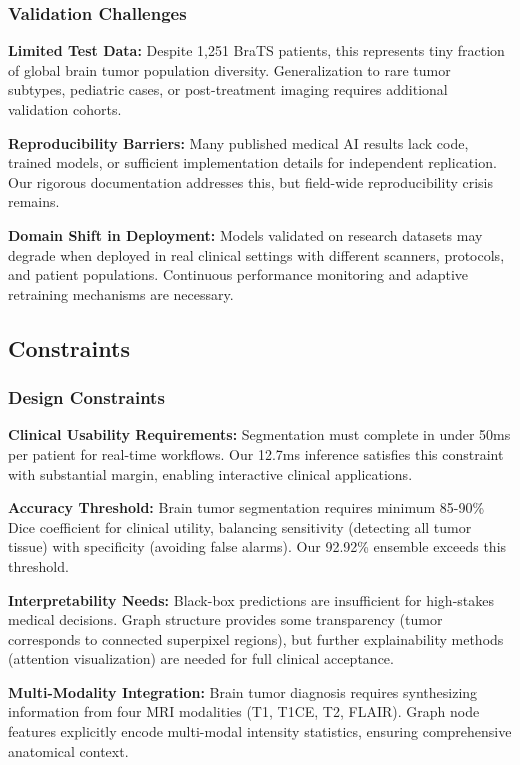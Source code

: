 \subsubsection{Validation Challenges}

\textbf{Limited Test Data:} Despite 1,251 BraTS patients, this represents tiny fraction of global brain tumor population diversity. Generalization to rare tumor subtypes, pediatric cases, or post-treatment imaging requires additional validation cohorts.

\textbf{Reproducibility Barriers:} Many published medical AI results lack code, trained models, or sufficient implementation details for independent replication. Our rigorous documentation addresses this, but field-wide reproducibility crisis remains.

\textbf{Domain Shift in Deployment:} Models validated on research datasets may degrade when deployed in real clinical settings with different scanners, protocols, and patient populations. Continuous performance monitoring and adaptive retraining mechanisms are necessary.


\subsection{Constraints}

\subsubsection{Design Constraints}

\textbf{Clinical Usability Requirements:} Segmentation must complete in under 50ms per patient for real-time workflows. Our 12.7ms inference satisfies this constraint with substantial margin, enabling interactive clinical applications.

\textbf{Accuracy Threshold:} Brain tumor segmentation requires minimum 85-90\% Dice coefficient for clinical utility, balancing sensitivity (detecting all tumor tissue) with specificity (avoiding false alarms). Our 92.92\% ensemble exceeds this threshold.

\textbf{Interpretability Needs:} Black-box predictions are insufficient for high-stakes medical decisions. Graph structure provides some transparency (tumor corresponds to connected superpixel regions), but further explainability methods (attention visualization) are needed for full clinical acceptance.

\textbf{Multi-Modality Integration:} Brain tumor diagnosis requires synthesizing information from four MRI modalities (T1, T1CE, T2, FLAIR). Graph node features explicitly encode multi-modal intensity statistics, ensuring comprehensive anatomical context.


